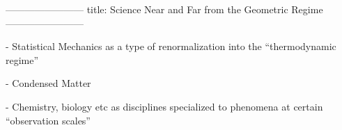------------------------
title: Science Near and Far from the Geometric Regime
------------------------

- Statistical Mechanics as a type of renormalization into the ``thermodynamic regime''

- Condensed Matter

- Chemistry, biology etc as disciplines specialized to phenomena at certain ``observation scales''
